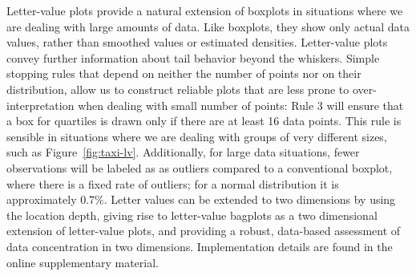 \documentclass[12pt,oneside]{article}
\begin{document}
Letter-value plots provide a natural extension of boxplots in situations where we are dealing with large amounts of data. Like boxplots, they show only actual data values, rather than smoothed values or estimated densities. Letter-value plots convey further information about tail behavior beyond the whiskers. Simple stopping rules that depend on neither the number of points nor on their distribution, allow us to construct reliable plots that are less prone to over-interpretation when dealing with small number of points: Rule 3 will ensure that a box for quartiles is drawn only if there are at least 16 data points. This rule is sensible in situations where we are dealing with groups of very different sizes, such as Figure~\ref{fig:taxi-lv}. Additionally, for large data situations, fewer observations will be labeled as as outliers compared to a conventional boxplot, where there is a fixed rate of outliers; for a normal distribution it is approximately 0.7\%. Letter values can be extended to two dimensions by using the location depth, giving rise to letter-value bagplots as a two dimensional extension of letter-value plots, and providing a robust, data-based assessment of data concentration in two dimensions. Implementation details are found in the online supplementary material.



%
\end{document}
